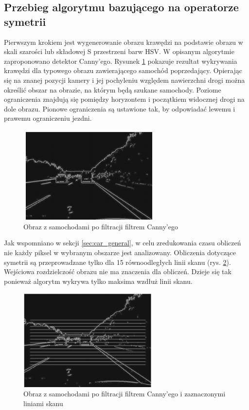 \subsection{Przebieg algorytmu bazującego na operatorze symetrii}
Pierwszym krokiem jest wygenerowanie obrazu krawędzi na podstawie obrazu w skali szarości lub składowej S przestrzeni barw HSV. W opisanym algorytmie zaproponowano detektor Canny'ego. Rysunek \ref{fig:car_edge} pokazuje rezultat wykrywania krawędzi dla typowego obrazu zawierającego samochód poprzedający. Opierając się na znanej pozycji kamery i jej pochyleniu względem nawierzchni drogi można określić obszar na obrazie, na którym będą szukane samochody. Poziome ograniczenia znajdują się pomiędzy horyzontem i początkiem widocznej drogi na dole obrazu. Pionowe ograniczenia są ustawione tak, by odpowiadać lewemu i prawemu ograniczeniu jezdni. 

\begin{figure}
  \centering
  \includegraphics[width=7cm]{img/car_canny.png}
  \caption{Obraz z samochodami po filtracji filtrem Canny'ego\cite{T1}}
  \label{fig:car_edge}
\end{figure}

Jak wspomniano w sekcji \ref{sec:car_general}, w celu zredukowania czasu obliczeń nie każdy piksel w wybranym obszarze jest analizowany. Obliczenia dotyczące symetrii są przeprowadzane tylko dla 15 równoodległych linii skanu (rys. \ref{fig:car_scan_lines1}). Wejściowa rozdzielczość obrazu nie ma znaczenia dla obliczeń. Dzieje się tak ponieważ algorytm wykrywa tylko maksima wzdłuż linii skanu.

\begin{figure}
  \centering
  \includegraphics[width=7cm]{img/car_lines.png}
  \caption{Obraz z samochodami po filtracji filtrem Canny'ego i zaznaczonymi liniami skanu\cite{T1}}
  \label{fig:car_scan_lines1}
\end{figure}

